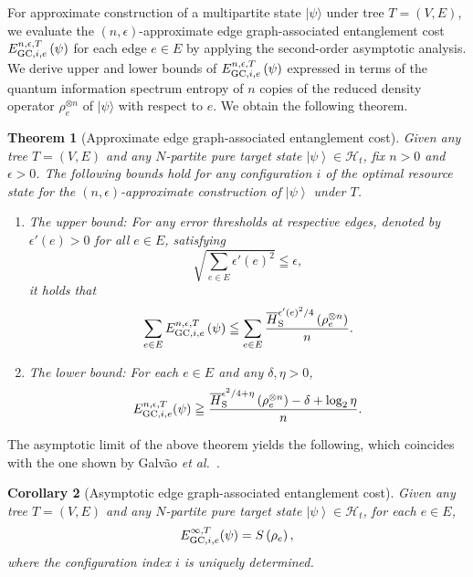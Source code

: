 \documentclass[preprintnumbers,aps,amsmath,amssymb,pra,twocolumn,showpacs,superscriptaddress,floatfix]{revtex4-1}
\def\Ket#1{\left|#1\right\rangle}
\newcommand{\ket}[1]{|{#1}\rangle}
\theoremstyle{plain}
\newtheorem{theorem}{Theorem}
\newtheorem{corollary}[theorem]{Corollary}
\theoremstyle{definition}
\theoremstyle{remark}
\begin{document}
For approximate construction of a multipartite state $\ket{\psi}$ under tree $T=(V,E)$,  we evaluate the $(n,\epsilon)$-approximate edge graph-associated entanglement cost $E_{\textup{GC},i,e}^{n,\epsilon,T}\left(\psi\right)$ for each edge $e \in E$ by applying the second-order asymptotic analysis.    We derive upper and lower bounds of $E_{\textup{GC},i,e}^{n,\epsilon,T}\left(\psi\right)$ expressed in terms of the quantum information spectrum entropy of $n$ copies of the reduced density operator $\rho_e^{\otimes n}$ of $\ket{\psi}$ with respect to $e$.   We obtain the following theorem.

\begin{theorem}[Approximate edge graph-associated entanglement cost]
\label{thm:asymptotic}
Given any tree $T=(V,E)$ and any $N$-partite pure target state $\Ket{\psi}\in\mathcal{H}_t$,
fix $n>0$ and $\epsilon>0$.
The following bounds hold for any configuration $i$ of the optimal resource state for the $(n,\epsilon)$-approximate construction of $\Ket{\psi}$ under $T$.
\begin{enumerate}
    \item The upper bound: For any error thresholds at respective edges, denoted by $\epsilon'(e)>0$ for all $e\in E$, satisfying
\[
  \sqrt{\sum_{e\in E}{\epsilon'(e)}^2}\leqq\epsilon,
\]
it holds that
    \[
        \sum_{e\in E}E_{\textup{GC},i,e}^{n,\epsilon,T}\left(\psi\right) \leqq \sum_{e\in E}\frac{\overline{H}_{\textup{S}}^{{\epsilon'(e)}^2/4}\left(\rho_e^{\otimes n}\right)}{n}.
    \]
\item The lower bound: For each $e\in E$ and any $\delta,\eta>0$,
    \[
        E_{\textup{GC},i,e}^{n,\epsilon,T}{\left(\psi\right)}\geqq \frac{\overline{H}_{\textup{S}}^{\epsilon^2/4+\eta}\left(\rho_e^{\otimes n}\right)-\delta+\log_2 \eta}{n}.
    \]
\end{enumerate}
\end{theorem}

The asymptotic limit of the above theorem yields the following, which coincides with the one shown by Galv\~ao \textit{et al.}~\cite{RefWorks:148}.
\begin{corollary}[Asymptotic edge graph-associated entanglement cost]
\label{cor:asymptotic_cost}
Given any tree $T=(V,E)$ and any $N$-partite pure target state $\Ket{\psi}\in\mathcal{H}_t$, for each $e\in E$,
\[
E^{\infty, T}_{\textup{GC},i,e}(\psi)=S\left(\rho_e\right),
\]
where the configuration index $i$ is uniquely determined.
\end{corollary}
\end{document}
